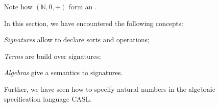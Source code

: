 \documentclass[landscape, slides, light]{mmiss}
\newcommand{\Nat}{\mbox{$\mathbb N$}} %
\begin{document}
\begin{Package}
\begin{Section}[Label=IntroAlgSpec, Title={Signatures, Terms and Algebras}]
\begin{Paragraph}[Label=Example, Title=A Simple Example]
Note how $(\Nat, 0, +)$ form an .
\end{Paragraph}

\begin{Summary}[Label=Summary, Title={Summing Up}]
In this section, we have encountered the following concepts:
\begin{Itemize}
\item
\emph{Signatures} allow to declare sorts and operations;
\item
\emph{Terms} are build over signatures;
\item
\emph{Algebras} give a semantics to signatures.
\item
Further, we have seen how to specify natural numbers in the algebraic
specification language CASL.
\end{Itemize}
\end{Summary}
\end{Section}
\end{Package}
\end{document}
